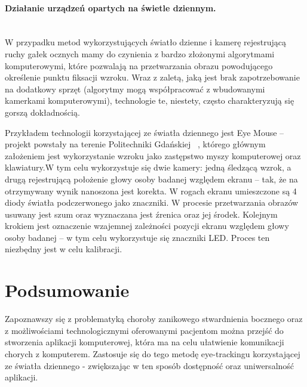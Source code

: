 \documentclass[twoside,a4paper]{book}
\begin{document}
\paragraph{Działanie urządzeń  opartych na świetle dziennym. }\leavevmode\\
W przypadku  metod  wykorzystujących światło dzienne i kamerę rejestrującą ruchy gałek ocznych mamy do czynienia z bardzo złożonymi algorytmami komputerowymi, które pozwalają na przetwarzania obrazu powodującego określenie punktu fiksacji wzroku. Wraz z zaletą, jaką jest brak zapotrzebowanie na dodatkowy sprzęt (algorytmy mogą współpracować z wbudowanymi kamerkami komputerowymi), technologie te, niestety, często charakteryzują się gorszą dokładnością.

Przykładem technologii korzystającej ze światła dziennego jest Eye Mouse – projekt powstały na terenie Politechniki Gdańskiej ~\cite{eyemouse}, którego głównym założeniem jest wykorzystanie wzroku jako zastępstwo myszy komputerowej oraz klawiatury.W tym celu wykorzystuje się dwie kamery: jedną śledzącą wzrok, a drugą rejestrującą położenie głowy osoby badanej względem ekranu – tak, że na otrzymywany wynik nanoszona jest korekta.  W rogach ekranu umieszczone są 4 diody światła podczerwonego jako znaczniki. W procesie przetwarzania obrazów usuwany jest szum oraz wyznaczana jest źrenica oraz jej środek. Ko\-lej\-nym krokiem jest oznaczenie wzajemnej zależności pozycji ekranu względem głowy osoby badanej – w tym celu wykorzystuje się znaczniki LED. Proces ten niezbędny jest w celu kalibracji.
\section{Podsumowanie}
Zapoznawszy się z problematyką choroby zanikowego stwardnienia bocznego oraz z możliwościami technologicznymi oferowanymi pacjentom można przejść do stworzenia aplikacji komputerowej, która ma na celu ułatwienie komunikacji chorych z komputerem. Zastosuje się do tego metodę eye-trackingu korzystającej ze światła dziennego - zwiększając w ten sposób dostępność oraz uniwersalność aplikacji. 
\end{document}
